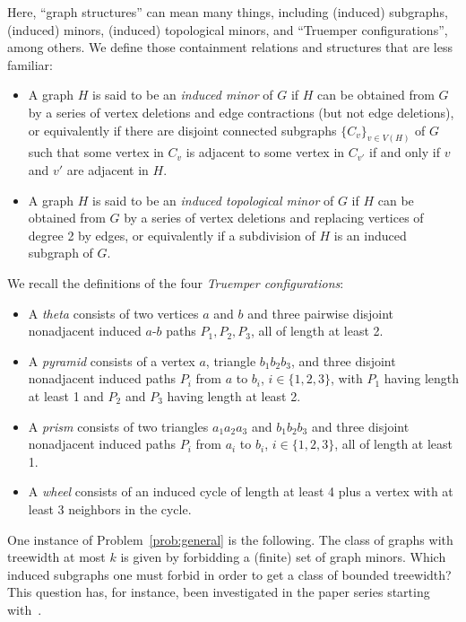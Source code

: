 \documentclass{article}
\begin{document}
Here, ``graph structures'' can mean many things, including (induced) subgraphs, (induced) minors, (induced) topological minors, and ``Truemper configurations'', among others. We define those containment relations and structures that are less familiar:
\begin{itemize}
    \item A graph $H$ is said to be an \textit{induced minor} of $G$ if $H$ can be obtained from $G$ by a series of vertex deletions and edge contractions (but not edge deletions), or equivalently if there are disjoint connected subgraphs $\{C_v\}_{v\in V(H)}$ of $G$ such that some vertex in $C_v$ is adjacent to some vertex in $C_{v'}$ if and only if $v$ and $v'$ are adjacent in $H$.
    \item A graph $H$ is said to be an \textit{induced topological minor} of $G$ if $H$ can be obtained from $G$ by a series of vertex deletions and replacing vertices of degree 2 by edges, or equivalently if a subdivision of $H$ is an induced subgraph of $G$.
\end{itemize}

We recall the definitions of the four \textit{Truemper configurations}:
\begin{itemize}
    \item A \textit{theta} consists of two vertices $a$ and $b$ and three pairwise disjoint nonadjacent induced $a$-$b$ paths $P_1,P_2,P_3$, all of length at least 2.
    \item A \textit{pyramid} consists of a vertex $a$, triangle $b_1b_2b_3$, and three disjoint nonadjacent induced paths $P_i$ from $a$ to $b_i$, $i\in \{1,2,3\}$, with $P_1$ having length at least 1 and $P_2$ and $P_3$ having length at least 2.
    \item A \textit{prism} consists of two triangles $a_1a_2a_3$ and $b_1b_2b_3$ and three disjoint nonadjacent induced paths $P_i$ from $a_i$ to $b_i$, $i\in \{1,2,3\}$, all of length at least 1.
    \item A \textit{wheel} consists of an induced cycle of length at least 4 plus a vertex with at least 3 neighbors in the cycle.
\end{itemize}

One instance of Problem~\ref{prob:general} is the following. The class of graphs with treewidth at most $k$ is given by forbidding a (finite) set of graph minors. Which induced subgraphs one must forbid in order to get a class of bounded treewidth? This question has, for instance, been investigated in the paper series starting with~\cite{tara}.
\end{document}
